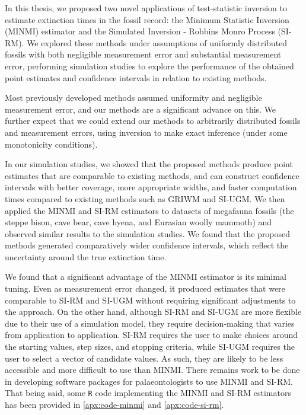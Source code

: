 
In this thesis, we proposed two novel applications of test-statistic inversion to estimate extinction times in the fossil record: the Minimum Statistic Inversion (MINMI) estimator and the Simulated Inversion - Robbins Monro Process (SI-RM). We explored these methods under assumptions of uniformly distributed fossils with both negligible measurement error and substantial measurement error, performing simulation studies to explore the performance of the obtained point estimates and confidence intervals in relation to existing methods.

Most previously developed methods assumed uniformity and negligible measurement error, and our methods are a significant advance on this. We further expect that we could extend our methods to arbitrarily distributed fossils and measurement errors, using inversion to make exact inference (under some monotonicity conditions).

In our simulation studies, we showed that the proposed methods produce point estimates that are comparable to existing methods, and can construct confidence intervals with better coverage, more appropriate widths, and faster computation times compared to existing methods such as GRIWM and SI-UGM. We then applied the MINMI and SI-RM estimators to datasets of megafauna fossils (the steppe bison, cave bear, cave hyena, and Eurasian woolly mammoth) and observed similar results to the simulation studies. We found that the proposed methods generated comparatively wider confidence intervals, which reflect the uncertainty around the true extinction time.

We found that a significant advantage of the MINMI estimator is its minimal tuning. Even as measurement error changed, it produced estimates that were comparable to SI-RM and SI-UGM without requiring significant adjustments to the approach. On the other hand, although SI-RM and SI-UGM are more flexible due to their use of a simulation model, they require decision-making that varies from application to application. SI-RM requires the user to make choices around the starting values, step sizes, and stopping criteria, while SI-UGM requires the user to select a vector of candidate values. As such, they are likely to be less accessible and more difficult to use than MINMI. There remains work to be done in developing software packages for palaeontologists to use MINMI and SI-RM. That being said, some \texttt{R} code implementing the MINMI and SI-RM estimators has been provided in \autoref{apx:code-minmi} and \autoref{apx:code-si-rm}. 

